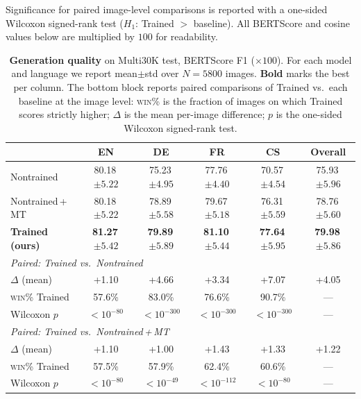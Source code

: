 \documentclass[11pt]{article}
\begin{document}
Significance for paired image-level comparisons is reported with a
one-sided Wilcoxon signed-rank test ($H_1$: Trained $>$ baseline).
All BERTScore and cosine values below are multiplied by $100$ for
readability.

\begin{table}[t]
\centering
\caption{\textbf{Generation quality} on Multi30K test, BERTScore F1
($\times 100$). For each model and language we report mean$\pm$std
over $N\!=\!5800$ images. \textbf{Bold} marks the best per column.
The bottom block reports paired comparisons of Trained vs.\ each
baseline at the image level: \textsc{win\%} is the fraction of images
on which Trained scores strictly higher; $\Delta$ is the mean
per-image difference; $p$ is the one-sided Wilcoxon signed-rank test.}
\label{tab:bertscore}
\small
\begin{tabular}{lccccc}
\toprule
& EN & DE & FR & CS & Overall \\
\midrule
Nontrained        & 80.18\,\scriptsize$\pm5.22$ & 75.23\,\scriptsize$\pm4.95$ & 77.76\,\scriptsize$\pm4.40$ & 70.57\,\scriptsize$\pm4.54$ & 75.93\,\scriptsize$\pm5.96$ \\
Nontrained\,+\,MT & 80.18\,\scriptsize$\pm5.22$ & 78.89\,\scriptsize$\pm5.58$ & 79.67\,\scriptsize$\pm5.18$ & 76.31\,\scriptsize$\pm5.59$ & 78.76\,\scriptsize$\pm5.60$ \\
\textbf{Trained (ours)} & \textbf{81.27}\,\scriptsize$\pm5.42$ & \textbf{79.89}\,\scriptsize$\pm5.89$ & \textbf{81.10}\,\scriptsize$\pm5.44$ & \textbf{77.64}\,\scriptsize$\pm5.95$ & \textbf{79.98}\,\scriptsize$\pm5.86$ \\
\midrule
\multicolumn{6}{l}{\emph{Paired: Trained vs.\ Nontrained}} \\
\quad $\Delta$ (mean)               & +1.10  & +4.66  & +3.34  & +7.07  & +4.05 \\
\quad \textsc{win\%} Trained        & 57.6\% & 83.0\% & 76.6\% & 90.7\% & --- \\
\quad Wilcoxon $p$                  & $<10^{-80}$ & $<10^{-300}$ & $<10^{-300}$ & $<10^{-300}$ & --- \\
\midrule
\multicolumn{6}{l}{\emph{Paired: Trained vs.\ Nontrained\,+\,MT}} \\
\quad $\Delta$ (mean)               & +1.10  & +1.00  & +1.43  & +1.33  & +1.22 \\
\quad \textsc{win\%} Trained        & 57.5\% & 57.9\% & 62.4\% & 60.6\% & --- \\
\quad Wilcoxon $p$                  & $<10^{-80}$ & $<10^{-49}$ & $<10^{-112}$ & $<10^{-80}$ & --- \\
\bottomrule
\end{tabular}
\end{table}
\end{document}
